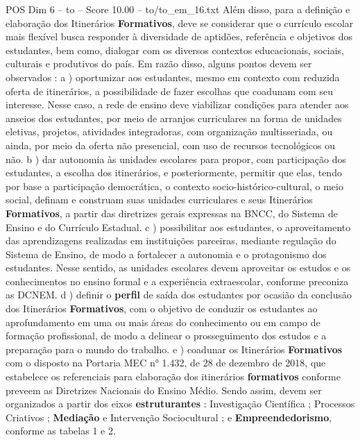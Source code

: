 \begin{textsample}{POS Dim 6 – to – Score 10.00 – to/to\_em\_16.txt}
Além disso, para a definição e elaboração dos Itinerários \textbf{Formativos}, deve se considerar que o currículo escolar mais flexível busca responder à diversidade de aptidões, referência e objetivos dos estudantes, bem como, dialogar com os diversos contextos educacionais, sociais, culturais e produtivos do país.
Em razão disso, alguns pontos devem ser observados : a ) oportunizar aos estudantes, mesmo em contexto com reduzida oferta de itinerários, a possibilidade de fazer escolhas que coadunam com seu interesse.
Nesse caso, a rede de ensino deve viabilizar condições para atender aos anseios dos estudantes, por meio de arranjos curriculares na forma de unidades eletivas, projetos, atividades integradoras, com organização multisseriada, ou ainda, por meio da oferta não presencial, com uso de recursos tecnológicos ou não. b ) dar autonomia às unidades escolares para propor, com participação dos estudantes, a escolha dos itinerários, e posteriormente, permitir que elas, tendo por base a participação democrática, o contexto socio-histórico-cultural, o meio social, definam e construam suas unidades curriculares e seus Itinerários \textbf{Formativos}, a partir das diretrizes gerais expressas na BNCC, do Sistema de Ensino e do Currículo Estadual. c ) possibilitar aos estudantes, o aproveitamento das aprendizagens realizadas em instituições parceiras, mediante regulação do Sistema de Ensino, de modo a fortalecer a autonomia e o protagonismo dos estudantes.
Nesse sentido, as unidades escolares devem aproveitar os estudos e os conhecimentos no ensino formal e a experiência extraescolar, conforme preconiza as DCNEM. d ) definir o \textbf{perfil} de saída dos estudantes por ocasião da conclusão dos Itinerários \textbf{Formativos}, com o objetivo de conduzir os estudantes ao aprofundamento em uma ou mais áreas do conhecimento ou em campo de formação profissional, de modo a delinear o prosseguimento dos estudos e a preparação para o mundo do trabalho. e ) coadunar os Itinerários \textbf{Formativos} com o disposto na Portaria MEC n{\EmojiFont °} 1.432, de 28 de dezembro de 2018, que estabelece os referenciais para elaboração dos itinerários \textbf{formativos} conforme preveem as Diretrizes Nacionais do Ensino Médio.
Sendo assim, devem ser organizados a partir dos eixos \textbf{estruturantes} : Investigação Científica ; Processos Criativos ; \textbf{Mediação} e Intervenção Sociocultural ; e \textbf{Empreendedorismo}, conforme as tabelas 1 e 2.

\end{textsample}
